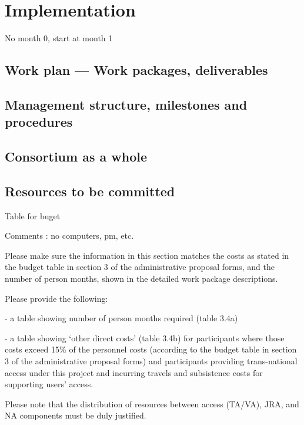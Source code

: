\chapter{Implementation}\label{chap:implementation}

{\color{red} No month 0, start at month 1}

\section{Work plan --- Work packages, deliverables}



\section{Management structure, milestones and procedures}



\section{Consortium as a whole}\label{sec:consortium}



\section{Resources to be committed}\label{sec:resources}


Table for buget

Comments : no computers, pm, etc.

\begin{todo}{}\color{red}
Please make sure the information in this section matches the costs as stated in the budget table in section 3 of the administrative proposal forms, and the number of person months, shown in the detailed work package descriptions.

Please provide the following:

- a table showing number of person months required (table 3.4a)

- a table showing ‘other direct costs’ (table 3.4b) for participants where those  costs exceed 15\% of the personnel costs (according to the budget  table in section 3 of the administrative proposal forms) and participants providing trans-national access under this project and incurring travels and subsistence costs for supporting users' access.

Please note that the distribution of resources between access (TA/VA), JRA, and NA components must be duly justified.
\end{todo}

